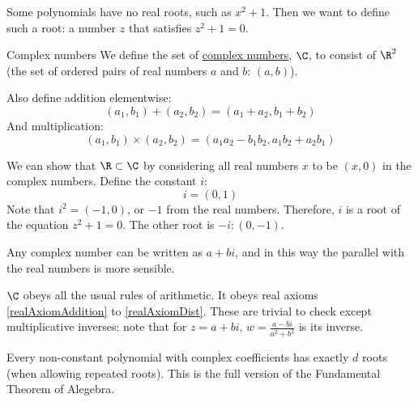 \documentclass[../Main.tex]{subfiles}
\begin{document}
Some polynomials have no real roots, such as $x^2 + 1$. Then we want to define such a root: a number $z$ that satisfies $z^2 + 1 = 0$.\par
\begin{definition}{Complex numbers}
    We define the set of \underline{complex numbers}, $\C$, to consist of $\R^2$ (the set of ordered pairs of real numbers $a$ and $b$: $(a, b)$).\par
    Also define addition elementwise:
    \begin{equation}
        (a_1, b_1) + (a_2, b_2) = (a_1 + a_2, b_1 + b_2)
        \label{eqnComplexAdd}
    \end{equation}
    And multiplication:
    \begin{equation}
        (a_1, b_1) \times (a_2, b_2) = (a_1 a_2 - b_1 b_2, a_1 b_2 + a_2 b_1)
        \label{eqnComplexTimes}
    \end{equation}
\end{definition}
We can show that $\R \subset \C$ by considering all real numbers $x$ to be $(x, 0)$ in the complex numbers.
Define the constant $i$:
\begin{equation}
    i = (0, 1)
\end{equation}
Note that $i^2 = (-1, 0)$, or $-1$ from the real numbers. Therefore, $i$ is a root of the equation $z^2 + 1 = 0$. The other root is $-i: (0, -1)$.\par
Any complex number can be written as $a + bi$, and in this way the parallel with the real numbers is more sensible.\par
\begin{remarks}
    \item $\C$ obeys all the usual rules of arithmetic. It obeys real axioms \ref{realAxiomAddition} to \ref{realAxiomDist}. These are trivial to check except multiplicative inverses: note that for $z = a + bi$, $w = \frac{a - bi}{a^2 + b^2}$ is its inverse.
    \item Every non-constant polynomial with complex coefficients has exactly $d$ roots (when allowing repeated roots). This is the full version of the Fundamental Theorem of Alegebra.
\end{remarks}
\end{document}
